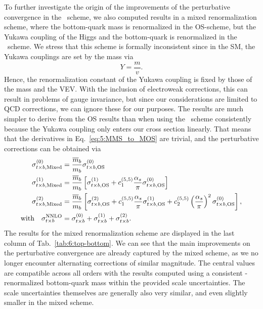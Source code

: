 To further investigate the origin of the improvements of the perturbative convergence in the \MS\ scheme, we also computed results in a mixed renormalization scheme, where the bottom-quark mass is renormalized in the \acs{OS}-scheme, but the Yukawa coupling of the Higgs and the bottom-quark is renormalized in the \MS\ scheme. We stress that this scheme is formally inconsistent since in the \acs{SM}, the Yukawa couplings are set by the mass via
\begin{equation}
Y = \frac{m}{v}.
\end{equation}
Hence, the renormalization constant of the Yukawa coupling is fixed by those of the mass and the \acs{VEV}. With the inclusion of electroweak corrections, this can result in problems of gauge invariance, but since our considerations are limited to \acs{QCD} corrections, we can ignore these for our purposes. The results are much simpler to derive from the \acs{OS} results than when using the \MS\ scheme consistently because the Yukawa coupling only enters our cross section linearly. That means that the derivatives in Eq.~\eqref{eq:5:MMS_to_MOS} are trivial, and the perturbative corrections can be obtained via
\begin{equation}
\begin{split}
\sigma^{(0)}_{t\times b, \text{Mixed}} &= \frac{\overline{m}_b}{m_b} \sigma^{(0)}_{t\times b, \text{OS}} \\
\sigma^{(1)}_{t \times b, \text{Mixed}} &= \frac{\overline{m}_b}{m_b} \left[ \sigma^{(1)}_{t \times b, \text{OS}} + c_1^{(5,5)} \frac{\alpha_s}{\pi} \sigma^{(0)}_{t \times b, \text{OS}} \right] \\
\sigma^{(2)}_{t \times b, \text{Mixed}} &= \frac{\overline{m}_b}{m_b} \left[ \sigma^{(2)}_{t \times b, \text{OS}} + c_1^{(5,5)} \frac{\alpha_s}{\pi} \sigma^{(1)}_{t \times b, \text{OS}} + c_2^{(5,5)} \left( \frac{\alpha_s}{\pi} \right)^2 \sigma^{(0)}_{t \times b, \text{OS}} \right], \\
\text{with} \quad \sigma^{\text{NNLO}}_{t \times b} &= \sigma^{(0)}_{t \times b} + \sigma^{(1)}_{t \times b} + \sigma^{(2)}_{t \times b}.
\end{split}
\end{equation}
The results for the mixed renormalization scheme are displayed in the last column of Tab.~\ref{tab:6:top-bottom}. We can see that the main improvements on the perturbative convergence are already captured by the mixed scheme, as we no longer encounter alternating corrections of similar magnitude. The central values are compatible across all orders with the results computed using a consistent \MS-renormalized bottom-quark mass within the provided scale uncertainties. The scale uncertainties themselves are generally also very similar, and even slightly smaller in the mixed scheme.

